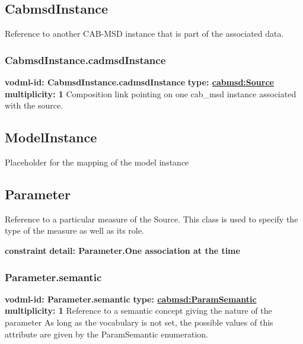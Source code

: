   \subsection{CabmsdInstance}
  \label{sect:CabmsdInstance}
    Reference to another CAB-MSD instance that is part of the associated data.

    \subsubsection{CabmsdInstance.cadmsdInstance}
      \textbf{vodml-id: CabmsdInstance.cadmsdInstance} \newline
      \textbf{type: \hyperref[sect:Source]{cabmsd:Source}} \newline
      \textbf{multiplicity: 1} \newline 
      Composition link pointing on one cab\_msd instance associated with the source.

  \subsection{ModelInstance}
  \label{sect:ModelInstance}
    Placeholder for the mapping of the model instance

  \subsection{Parameter}
  \label{sect:Parameter}
    Reference to a particular measure of the Source. This class is used to specify the type of the measure as well as its role.

    \noindent \textbf{constraint} \newline
    \indent    \textbf{detail: Parameter.One association at the time
 }\newline


    \subsubsection{Parameter.semantic}
      \textbf{vodml-id: Parameter.semantic} \newline
      \textbf{type: \hyperref[sect:ParamSemantic]{cabmsd:ParamSemantic}} \newline
      \textbf{multiplicity: 1} \newline 
      Reference to a semantic concept giving the nature of the parameter As long as the vocabulary is not set, the possible values of this attribute are given by the ParamSemantic enumeration.

